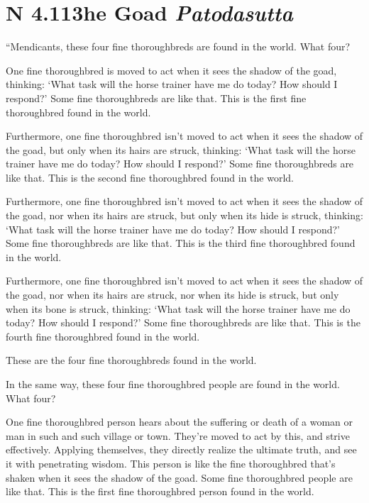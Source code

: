 \documentclass[12pt,openany]{book}%
\newcommand*{\suttatitleacronym}[1]{\smaller[2]{#1}\vspace*{.3em}}
\newcommand*{\suttatitletranslation}[1]{\linebreak{#1}}
\newcommand*{\suttatitleroot}[1]{\linebreak\smaller[2]\itshape{#1}}
\newcommand*{\tocacronym}[1]{\hspace*{-3.3em}{#1}\quad}
\newcommand*{\toctranslation}[1]{#1}
\newcommand*{\tocroot}[1]{(\textit{#1})}
\begin{document}
%
\section*{{\suttatitleacronym AN 4.113}{\suttatitletranslation The Goad }{\suttatitleroot Patodasutta}}
\addcontentsline{toc}{section}{\tocacronym{AN 4.113} \toctranslation{The Goad } \tocroot{Patodasutta}}

“Mendicants, these four fine thoroughbreds are found in the world. What four? 

One fine thoroughbred is moved to act when it sees the shadow of the goad, thinking: ‘What task will the horse trainer have me do today? How should I respond?’ Some fine thoroughbreds are like that. This is the first fine thoroughbred found in the world. 

Furthermore, one fine thoroughbred isn’t moved to act when it sees the shadow of the goad, but only when its hairs are struck, thinking: ‘What task will the horse trainer have me do today? How should I respond?’ Some fine thoroughbreds are like that. This is the second fine thoroughbred found in the world. 

Furthermore, one fine thoroughbred isn’t moved to act when it sees the shadow of the goad, nor when its hairs are struck, but only when its hide is struck, thinking: ‘What task will the horse trainer have me do today? How should I respond?’ Some fine thoroughbreds are like that. This is the third fine thoroughbred found in the world. 

Furthermore, one fine thoroughbred isn’t moved to act when it sees the shadow of the goad, nor when its hairs are struck, nor when its hide is struck, but only when its bone is struck, thinking: ‘What task will the horse trainer have me do today? How should I respond?’ Some fine thoroughbreds are like that. This is the fourth fine thoroughbred found in the world. 

These are the four fine thoroughbreds found in the world. 

In the same way, these four fine thoroughbred people are found in the world. What four? 

One fine thoroughbred person hears about the suffering or death of a woman or man in such and such village or town. They’re moved to act by this, and strive effectively. Applying themselves, they directly realize the ultimate truth, and see it with penetrating wisdom. This person is like the fine thoroughbred that’s shaken when it sees the shadow of the goad. Some fine thoroughbred people are like that. This is the first fine thoroughbred person found in the world. 
\end{document}
